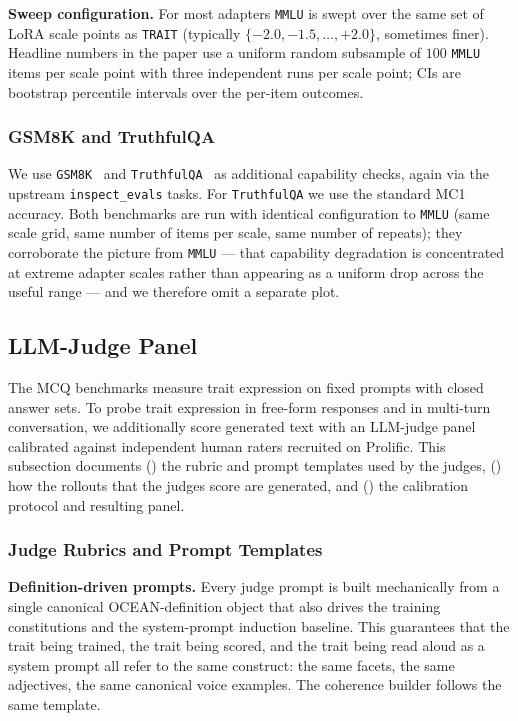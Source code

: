 \textbf{Sweep configuration.}
For most adapters \texttt{MMLU} is swept over the same set of LoRA scale points as \texttt{TRAIT} (typically $\{-2.0, -1.5, \ldots, +2.0\}$, sometimes finer). Headline numbers in the paper use a uniform random subsample of $100$ \texttt{MMLU} items per scale point with three independent runs per scale point; CIs are bootstrap percentile intervals over the per-item outcomes.

\subsubsection{GSM8K and TruthfulQA}\label{sec:appendix-e-mcq-other}

We use \texttt{GSM8K}~\citep{cobbe2021gsm8k} and \texttt{TruthfulQA}~\citep{lin2022truthfulqa} as additional capability checks, again via the upstream \texttt{inspect\_evals} tasks. For \texttt{TruthfulQA} we use the standard MC1 accuracy. Both benchmarks are run with identical configuration to \texttt{MMLU} (same scale grid, same number of items per scale, same number of repeats); they corroborate the picture from \texttt{MMLU} --- that capability degradation is concentrated at extreme adapter scales rather than appearing as a uniform drop across the useful range --- and we therefore omit a separate plot.

\subsection{LLM-Judge Panel}\label{sec:appendix-e-judge}

The MCQ benchmarks measure trait expression on fixed prompts with closed answer sets. To probe trait expression in free-form responses and in multi-turn conversation, we additionally score generated text with an LLM-judge panel calibrated against independent human raters recruited on Prolific. This subsection documents () the rubric and prompt templates used by the judges, () how the rollouts that the judges score are generated, and () the calibration protocol and resulting panel.

\subsubsection{Judge Rubrics and Prompt Templates}\label{sec:appendix-e-rubrics}

\textbf{Definition-driven prompts.}
Every judge prompt is built mechanically from a single canonical OCEAN-definition object that also drives the training constitutions and the system-prompt induction baseline. This guarantees that the trait being trained, the trait being scored, and the trait being read aloud as a system prompt all refer to the same construct: the same facets, the same adjectives, the same canonical voice examples. The coherence builder follows the same template.

